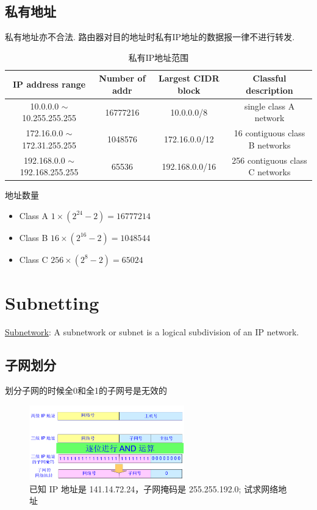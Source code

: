 \documentclass[a4paper]{report}
\begin{document}
\subsection{私有地址}
私有地址亦不合法. 路由器对目的地址时私有IP地址的数据报一律不进行转发. 
\begin{table}[htbp]
  \centering
    \begin{tabular}{cccc}
      \hline
    IP address range & Number of addr & Largest CIDR block & Classful description \\
    \hline
    10.0.0.0 $\sim$ 10.255.255.255 & 16777216 & 10.0.0.0/8  & single class A network \\
    172.16.0.0 $\sim$ 172.31.255.255 & 1048576 & 172.16.0.0/12  & 16 contiguous class B networks \\
    192.168.0.0 $\sim$ 192.168.255.255 & 65536 & 192.168.0.0/16  & 256 contiguous class C networks \\
    \hline
    \end{tabular}%
  \caption{私有IP地址范围}
  \label{tab:ip_private}%
\end{table}%
地址数量
\begin{itemize}
  \item Class A $1 \times (2^{24}-2)=16777214$
  \item Class B $16\times (2^{16}-2)=1048544$
  \item Class C $256\times (2^{8}-2) =65024$
\end{itemize}

\section{Subnetting}
\href{https://en.wikipedia.org/wiki/Subnetwork}{Subnetwork}: A subnetwork or subnet is a logical subdivision of an IP network.
\subsection{子网划分}
划分子网的时候全0和全1的子网号是无效的
\begin{figure}[H]
\centering
\includegraphics[width=0.6\textwidth]{ip_subnet_mask.png}
\caption{已知 IP 地址是 141.14.72.24，子网掩码是 255.255.192.0; 试求网络地址 }
\end{figure}
\end{document}
